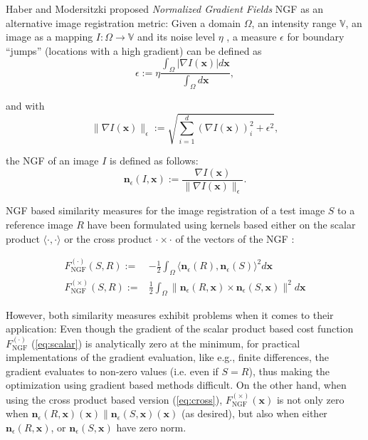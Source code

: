 \documentclass{InsightArticle}
\newcommand{\x}{\mathbf{x}}  %
\newcommand{\n}{\mathbf{n}}  %
\newcommand\nR{\n_\epsilon(R,\x)}  %
\newcommand\nS{\n_\epsilon(S,\x)}  %
\newcommand{\Fcs}{\ensuremath{{F_{\text{NGF}}^{(\cdot)}}} } %
\newcommand{\Fcc}{\ensuremath{{F_{\text{NGF}}^{(\times)}}} } %
\newcommand{\Domain}{\ensuremath{\Omega} }      %
\newcommand{\Range}{\ensuremath{\mathbb{V}} }   %
\newcommand{\noise}{\ensuremath{\eta} }
\newcommand{\scalar}[2]{\ensuremath{\langle #1, #2 \rangle} }
\begin{document}
Haber and Modersitzki \cite{haber05} proposed \emph{Normalized Gradient Fields} NGF as 
  an alternative image registration metric: 
Given a domain $\Domain$, an intensity range $\Range$, an image as a mapping $I: \Domain \rightarrow \Range$ 
  and its noise level \noise, a measure $\epsilon$
  for boundary ``jumps'' (locations with a high gradient) can be defined as
\begin{equation}
	\label{eq:epsilon}
	\epsilon := \eta \frac{ \int_{\Omega}  | \nabla I(\x) | d\x}{\int_{\Omega} d\x},
\end{equation}

\noindent
and with
\begin{equation}
	\label{eq:normeps}
       \| \nabla I(\x)\|_\epsilon := \sqrt{\sum_{i=1}^d \left(\nabla I(\x)\right)_i^2 + \epsilon^2},
\end{equation}

\noindent
the NGF of an image $I$ is defined as follows:
\begin{equation}
	\label{eq:ngf}
	\n_\epsilon(I, \x) := \frac{\nabla I(\x)}{\| \nabla I(\x)\|_\epsilon}.
\end{equation}

NGF based similarity measures for the image registration of a test image  $S$  to a reference image $R$ 
  have been formulated using kernels based either on the scalar product $\scalar{\cdot}{\cdot}$ 
  or the cross product $\cdot \times \cdot$ of the vectors of the  NGF \cite{haber05}: 

\begin{align}
	\label{eq:scalar}
	\Fcs (S,R) := & - \frac{1}{2} \int_\Omega  \scalar{\n_\epsilon(R)}{\n_\epsilon(S)} ^ 2 d\x \\
	\label{eq:cross}
	\Fcc (S,R) := & \frac{1}{2} \int_\Omega  \| \n_\epsilon(R,\x) \times \n_\epsilon(S,\x) \| ^ 2 d\x
\end{align}

\noindent 
However, both similarity measures exhibit problems when it comes to their application:
Even though the gradient of the scalar product based cost function \Fcs (\ref{eq:scalar}) is analytically  
  zero at the minimum, for  practical implementations of the gradient evaluation, 
  like e.g., finite differences,  the gradient evaluates to non-zero values  
  (i.e. even if $S=R$), thus making the optimization using gradient based methods difficult.
On the other hand, when using the cross product based version (\ref{eq:cross}), $\Fcc(\x)$ 
   is not only zero when $\nR(\x) \parallel \nS (\x)$ (as desired), but also 
   when either $\nR$, or $\nS$ have zero norm.
\end{document}
